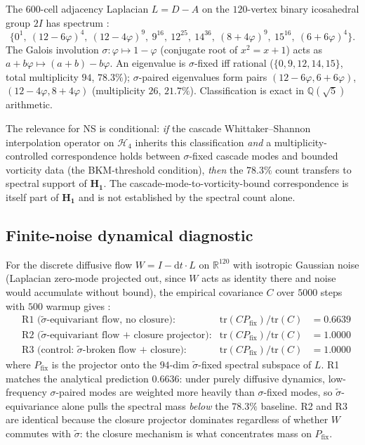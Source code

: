 \documentclass[11pt, a4paper]{amsart}
\theoremstyle{definition}
\newcommand{\R}{\mathbb{R}}
\newcommand{\Q}{\mathbb{Q}}
\newcommand{\HH}{\mathcal{H}}
\begin{document}
The 600-cell adjacency Laplacian $L = D - A$ on the
$120$-vertex binary icosahedral group $2I$ has spectrum
\cite{CascadeAttractorSpectrum}:
\[
  \{0^{1},\ (12{-}6\varphi)^{4},\ (12{-}4\varphi)^{9},\ 9^{16},\
   12^{25},\ 14^{36},\ (8{+}4\varphi)^{9},\ 15^{16},\
   (6{+}6\varphi)^{4}\}.
\]
The Galois involution $\sigma: \varphi \mapsto 1-\varphi$
(conjugate root of $x^2 = x + 1$) acts as
$a + b\varphi \mapsto (a+b) - b\varphi$.  An eigenvalue is
$\sigma$-fixed iff rational ($\{0,9,12,14,15\}$, total multiplicity
$94$, $\bm{78.3\%}$); $\sigma$-paired eigenvalues form pairs
$(12{-}6\varphi, 6{+}6\varphi)$, $(12{-}4\varphi, 8{+}4\varphi)$
(multiplicity $26$, $\bm{21.7\%}$).  Classification is exact in
$\Q(\sqrt 5)$ arithmetic.

The relevance for NS is conditional: \emph{if} the cascade
Whittaker--Shannon interpolation operator on $\HH_4$ inherits this
classification \emph{and} a multiplicity-controlled correspondence
holds between $\sigma$-fixed cascade modes and bounded vorticity
data (the BKM-threshold condition), \emph{then} the $78.3\%$
count transfers to spectral support of $\mathbf{H_1}$.  The
cascade-mode-to-vorticity-bound correspondence is itself part of
$\mathbf{H_1}$ and is not established by the spectral count alone.

\subsection{Finite-noise dynamical diagnostic}

For the discrete diffusive flow $W = I - \mathrm{d}t \cdot L$ on
$\R^{120}$ with isotropic Gaussian noise (Laplacian zero-mode
projected out, since $W$ acts as identity there and noise would
accumulate without bound), the empirical covariance $C$ over
$5000$ steps with $500$ warmup gives \cite{CascadeAttractorDynamics}:
\begin{align*}
&\text{R1 ($\widetilde\sigma$-equivariant flow, no closure):}
  &\mathrm{tr}(C P_{\mathrm{fix}})/\mathrm{tr}(C) &= 0.6639 \\
&\text{R2 ($\widetilde\sigma$-equivariant flow + closure projector):}
  &\mathrm{tr}(C P_{\mathrm{fix}})/\mathrm{tr}(C) &= 1.0000 \\
&\text{R3 (control: $\widetilde\sigma$-broken flow + closure):}
  &\mathrm{tr}(C P_{\mathrm{fix}})/\mathrm{tr}(C) &= 1.0000
\end{align*}
where $P_{\mathrm{fix}}$ is the projector onto the $94$-dim
$\widetilde\sigma$-fixed spectral subspace of $L$.  R1 matches the
analytical prediction $0.6636$: under purely diffusive dynamics,
low-frequency $\sigma$-paired modes are weighted more heavily than
$\sigma$-fixed modes, so $\widetilde\sigma$-equivariance alone
pulls the spectral mass \emph{below} the $78.3\%$ baseline.  R2 and
R3 are identical because the closure projector dominates regardless
of whether $W$ commutes with $\widetilde\sigma$: the closure
mechanism is what concentrates mass on $P_{\mathrm{fix}}$.
\end{document}
